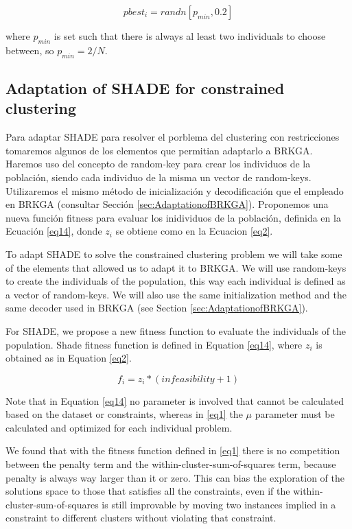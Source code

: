 \documentclass[review]{elsarticle}
\begin{document}
\begin{equation}
pbest_i = randn[p_{min}, 0.2]
\label{eq13}
\end{equation}

where $p_{min}$ is set such that there is always al least two individuals to choose between, so $p_{min} = 2/N$.

\subsection{Adaptation of SHADE for constrained clustering}

Para adaptar SHADE para resolver el porblema del clustering con restricciones tomaremos algunos de los elementos que permitian adaptarlo a BRKGA. Haremos uso del concepto de random-key para crear los individuos de la población, siendo cada individuo de la misma un vector de random-keys. Utilizaremos el mismo método de inicialización y decodificación que el empleado en BRKGA (consultar Sección \ref{sec:AdaptationofBRKGA}). Proponemos una nueva función fitness para evaluar los inidividuos de la población, definida en la Ecuación \eqref{eq14}, donde $z_i$ se obtiene como en la Ecuacion \eqref{eq2}.

To adapt SHADE to solve the constrained clustering problem we will take some of the elements that allowed us to adapt it to BRKGA. We will use random-keys to create the individuals of the population, this way each individual is defined as a vector of random-keys. We will also use the same initialization method and the same decoder used in BRKGA (see Section \ref{sec:AdaptationofBRKGA}). 

For SHADE, we propose a new fitness function to evaluate the individuals of the population. Shade fitness function is defined in Equation \eqref{eq14}, where $z_i$ is obtained as in Equation \eqref{eq2}.

\begin{equation}
f_i = z_i * (infeasibility + 1)
\label{eq14}
\end{equation}

Note that in Equation \eqref{eq14} no parameter is involved that cannot be calculated based on the dataset or constraints, whereas in \eqref{eq1} the $\mu$ parameter must be calculated and optimized for each individual problem.

We found that with the fitness function defined in \eqref{eq1} there is no competition between the penalty term and the within-cluster-sum-of-squares term, because penalty is always way larger than it or zero. This can bias the  exploration of the solutions space to those that satisfies all the constraints, even if the within-cluster-sum-of-squares is still improvable by moving two instances implied in a constraint to different clusters without violating that constraint.
\end{document}
